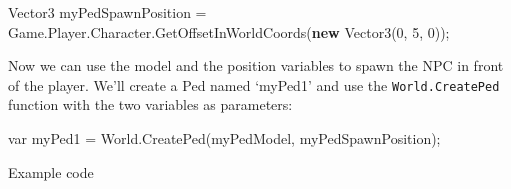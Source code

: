 \documentclass[
  openany]{book}
\newenvironment{Shaded}{\begin{snugshade}}{\end{snugshade}}
\newcommand{\DataTypeTok}[1]{\textcolor[rgb]{0.13,0.29,0.53}{#1}}
\newcommand{\DecValTok}[1]{\textcolor[rgb]{0.00,0.00,0.81}{#1}}
\newcommand{\FunctionTok}[1]{\textcolor[rgb]{0.00,0.00,0.00}{#1}}
\newcommand{\KeywordTok}[1]{\textcolor[rgb]{0.13,0.29,0.53}{\textbf{#1}}}
\newcommand{\NormalTok}[1]{#1}
\begin{document}
\begin{Shaded}
\begin{Highlighting}[]
\NormalTok{Vector3 myPedSpawnPosition = Game.}\FunctionTok{Player}\NormalTok{.}\FunctionTok{Character}\NormalTok{.}\FunctionTok{GetOffsetInWorldCoords}\NormalTok{(}\KeywordTok{new} \FunctionTok{Vector3}\NormalTok{(}\DecValTok{0}\NormalTok{, }\DecValTok{5}\NormalTok{, }\DecValTok{0}\NormalTok{));}
\end{Highlighting}
\end{Shaded}

Now we can use the model and the position variables to spawn the NPC in front of the player. We'll create a Ped named `myPed1' and use the \texttt{World.CreatePed} function with the two variables as parameters:

\begin{Shaded}
\begin{Highlighting}[]
\DataTypeTok{var}\NormalTok{ myPed1 = World.}\FunctionTok{CreatePed}\NormalTok{(myPedModel, myPedSpawnPosition); }
\end{Highlighting}
\end{Shaded}

Example code
\end{document}
